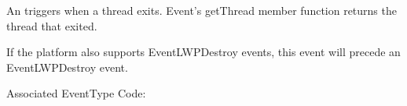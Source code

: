 
An  triggers when a thread exits. Event's
getThread member function returns the thread that exited.

If the platform also supports EventLWPDestroy events, this event will precede an
EventLWPDestroy event.

Associated EventType Code: 
